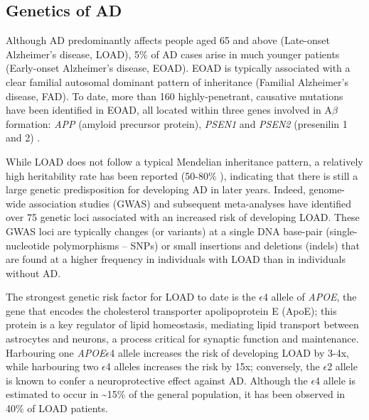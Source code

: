 \newpage
\subsection{Genetics of AD}
Although AD predominantly affects people aged 65 and above (Late-onset Alzheimer’s disease, LOAD), 5\% of AD cases arise in much younger patients (Early-onset Alzheimer’s disease, EOAD). EOAD is typically associated with a clear familial autosomal dominant pattern of inheritance (Familial Alzheimer’s disease, FAD)\cite{Jarmolowicz2015}. To date, more than 160 highly-penetrant, causative mutations have been identified in EOAD, all located within three genes involved in A$\beta$ formation: \textit{APP} (amyloid precursor protein), \textit{PSEN1} and \textit{PSEN2} (presenilin 1 and 2) \cite{LM2010,Chai2007}. %

While LOAD does not follow a typical Mendelian inheritance pattern, a relatively high heritability rate has been reported (50-80\% \cite{Gatz2006}), indicating that there is still a large genetic predisposition for developing AD in later years. Indeed, genome-wide association studies (GWAS) and subsequent meta-analyses \cite{Bellenguez2020,Naj2020,Kunkle2019,Jansen2019,Lambert2013,Naj2011,Hollingworth2011,Harold2009,Lambert2009,Bertram2008} have identified over 75 genetic loci associated with an increased risk of developing LOAD. These GWAS loci are typically changes (or variants) at a single DNA base-pair (single-nucleotide polymorphisms – SNPs) or small insertions and deletions (indels) that are found at a higher frequency in individuals with LOAD than in individuals without AD. 

The strongest genetic risk factor for LOAD to date is the $\epsilon$4 allele of \textit{APOE}\cite{Lambert2013}, the gene that encodes the cholesterol transporter apolipoprotein E (ApoE); this protein is a key regulator of lipid homeostasis, mediating lipid transport between astrocytes and neurons, a process critical for synaptic function and maintenance\cite{DH2001}. Harbouring one \textit{APOE}$\epsilon$4 allele increases the risk of developing LOAD by 3-4x, while harbouring two $\epsilon$4 alleles increases the risk by 15x\cite{Farrer1997}; conversely, the $\epsilon$2 allele is known to confer a neuroprotective effect against AD\cite{Nagy1995,EH1994}. Although the $\epsilon$4 allele is estimated to occur in \textasciitilde 15\% of the general population, it has been observed in 40\% of LOAD patients\cite{Farrer1997}. 

